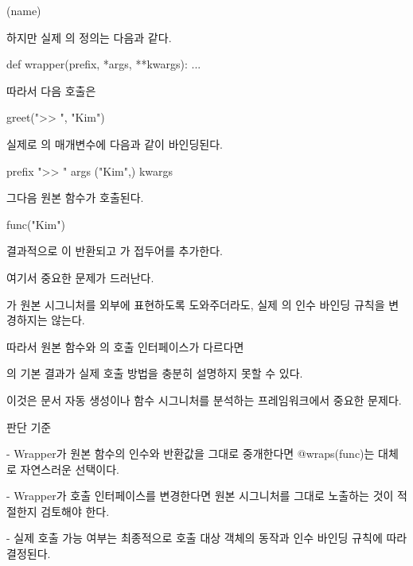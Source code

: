 \begin{dhkcode}
(name)
\end{dhkcode}

하지만 실제 의 정의는 다음과 같다.

\begin{dhkcode}
def wrapper(prefix, *args, **kwargs):
    ...
\end{dhkcode}

따라서 다음 호출은

\begin{dhkcode}
greet(">> ", "Kim")
\end{dhkcode}

실제로 의 매개변수에 다음과 같이 바인딩된다.

\begin{dhksmry}
    prefix \ra ">> "
    args   \ra ("Kim",)
    kwargs \ra {}
\end{dhksmry}

그다음 원본 함수가 호출된다.

\begin{dhkcode}
func("Kim")
\end{dhkcode}

결과적으로 이 반환되고 가 접두어를 추가한다.

여기서 중요한 문제가 드러난다.

가 원본 시그니처를 외부에 표현하도록 도와주더라도, 실제 의 인수 바인딩 규칙을 변경하지는 않는다.

따라서 원본 함수와 의 호출 인터페이스가 다르다면

의 기본 결과가 실제  호출 방법을 충분히 설명하지 못할 수 있다.

이것은 문서 자동 생성이나 함수 시그니처를 분석하는 프레임워크에서 중요한 문제다.

\begin{dhknote}
\begin{dhksmry}[centered]
판단 기준
\end{dhksmry}
\end{dhknote}

\begin{dhksmry}
- Wrapper가 원본 함수의 인수와 반환값을 그대로 중개한다면
  @wraps(func)는 대체로 자연스러운 선택이다.

- Wrapper가 호출 인터페이스를 변경한다면 원본 시그니처를 그대로
  노출하는 것이 적절한지 검토해야 한다.

- 실제 호출 가능 여부는 최종적으로 호출 대상 객체의 동작과 인수 바인딩
  규칙에 따라 결정된다.
\end{dhksmry}

